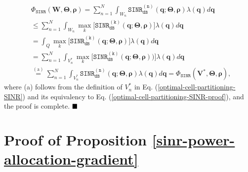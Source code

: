 \begin{align}
    &\Phi_{\mathtt{SINR}}(\bm{W},\mathbf{\Theta}, \bm{\rho}) = \sum_{n=1}^{N} \int_{W_n} \mathtt{SINR_{dB}^{(n)}} (\bm{q}; \mathbf{\Theta}, \bm{\rho}) \lambda(\bm{q}) d\bm{q} \\ &\leq \sum_{n=1}^{N} \int_{W_n} \max_k \Big[\mathtt{SINR_{dB}^{(k)}} (\bm{q}; \mathbf{\Theta}, \bm{\rho})\Big] \lambda(\bm{q}) d\bm{q} \nonumber\\
    &=\int_Q \! \max_k \! \Big[\mathtt{SINR_{dB}^{(k)}} (\bm{q}; \mathbf{\Theta}, \bm{\rho})\Big] \lambda(\bm{q}) d\bm{q} \nonumber\\&=\sum_{n=1}^{N} \! \int_{V_n^*} \! \max_k \! \Big[\mathtt{SINR_{dB}^{(k)}} (\bm{q}; \mathbf{\Theta}, \bm{\rho}))\Big] \lambda(\bm{q}) d\bm{q} \nonumber\\&
    \stackrel{(\text{a})}{=} \sum_{n=1}^{N} \int_{V_n^*} \mathtt{SINR_{dB}^{(n)}} (\bm{q}; \mathbf{\Theta}, \bm{\rho}) \lambda(\bm{q}) d\bm{q} = \Phi_{\mathtt{SINR}}(\bm{V}^*, \mathbf{\Theta}, \bm{\rho}),\nonumber
\end{align}
where (a) follows from the definition of $V_n^*$ in Eq. (\ref{optimal-cell-partitioning-SINR}) and its equivalency to Eq. (\ref{optimal-cell-partitioning-SINR-proof}), and the proof is complete. $\hfill\blacksquare$



\section{Proof of Proposition \ref{sinr-power-allocation-gradient}}\label{Appendix_B}

